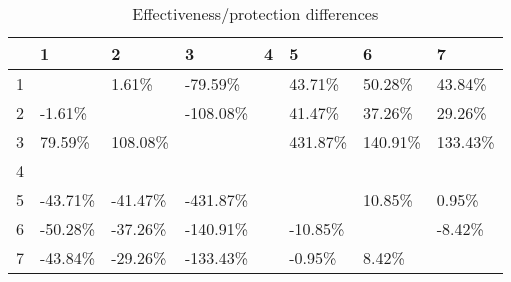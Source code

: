 \begin{table}[ht]
\centering
\begin{tabular}{rlllllll}
  \hline
 & 1 & 2 & 3 & 4 & 5 & 6 & 7 \\ 
  \hline
1 &  & 1.61\% & -79.59\% &  & 43.71\% & 50.28\% & 43.84\% \\ 
  2 & -1.61\% &  & -108.08\% &  & 41.47\% & 37.26\% & 29.26\% \\ 
  3 & 79.59\% & 108.08\% &  &  & 431.87\% & 140.91\% & 133.43\% \\ 
  4 &  &  &  &  &  &  &  \\ 
  5 & -43.71\% & -41.47\% & -431.87\% &  &  & 10.85\% & 0.95\% \\ 
  6 & -50.28\% & -37.26\% & -140.91\% &  & -10.85\% &  & -8.42\% \\ 
  7 & -43.84\% & -29.26\% & -133.43\% &  & -0.95\% & 8.42\% &  \\ 
   \hline
\end{tabular}
\caption{Effectiveness/protection differences} 
\end{table}
